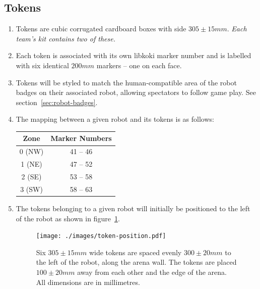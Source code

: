 \subsection{Tokens}
\label{sub:Tokens}
\begin{enumerate}
\item Tokens are cubic corrugated cardboard boxes with side $305 \pm 15 mm$.
      \emph{Each team's kit contains two of these.}

\item Each token is associated with its own libkoki marker number and is labelled with six identical $200mm$ markers -- one on each face.

\item Tokens will be styled to match the human-compatible area of the robot badges on their associated robot, allowing spectators to follow game play.
      See section~\ref{sec:robot-badges}.

\item The mapping between a given robot and its tokens is as follows:

\begin{center}
  \begin{tabular}{cc}
    \toprule
    \textbf{Zone} & \textbf{Marker Numbers} \\
    \midrule
    0 (NW) & 41 -- 46 \\
    1 (NE) & 47 -- 52 \\
    2 (SE) & 53 -- 58 \\
    3 (SW) & 58 -- 63 \\
    \bottomrule
  \end{tabular}
\end{center}

\item The tokens belonging to a given robot will initially be positioned to the left of the robot as shown in figure~\ref{fig:token-position}.

\begin{figure}
  \centering
  \texttt{[image: ./images/token-position.pdf]}
  \caption{Six $305 \pm 15mm$ wide tokens are spaced evenly $300 \pm 20mm$ to the left of the robot, along the arena wall.
           The tokens are placed $100 \pm 20mm$ away from each other and the edge of the arena.
           All dimensions are in millimetres.}
  \label{fig:token-position}
\end{figure}

\end{enumerate}

\clearpage
